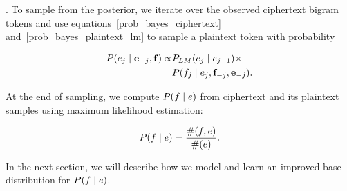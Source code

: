 . To sample from the posterior, we iterate over the observed ciphertext bigram tokens and use equations~\ref{prob_bayes_ciphertext} and~\ref{prob_bayes_plaintext_lm} to sample a plaintext token with probability

\begin{align} \label{prob_sampling_plaintext}
P( e_j \mid \mathbf{e}_{-j}, \mathbf{f} ) \propto & P_{LM}(e_j \mid e_{j-1}) \times \\
                                                                                                & P(f_j \mid e_j,\mathbf{f}_{-j}, \mathbf{e}_{-j}).
\end{align}

\iffalse
%
\[
\label{p_sample}
P_{sample}(e_{1}e_{2}) =  P(e_{1}e_{2}) \prod_{i=1}^{2}P_{CRP}(f_{i}|e_{i})
\]
%
In the above equation, the translation probability $P_{CRP}(f_{i}|e_{i})$ is modeled by the Chinese Restaurant Process(CRP) as defined in Equation \ref{p_channel}.
%
\[
\label{p_channel}
P_{CRP}(f_{i}|e_{i}) = \frac{\alpha P_0(f_{i}|e_{i})+count(f_{i},e_{i})}{\alpha+count(e_{i})}
\]
%
where $P_{0}$ is a base distribution, also known as a prior, and $\alpha$ is a parameter that controls how much we trust the base distribution. $count(f_{i},e_{i})$ and $count(e_{i})$ record the number of times $f_{i},e_{i}$ and $e_{i}$ appear in previously generated samples respectively. The base distribution is given independently, and in all the previous work, it is set to uniform.
\fi

At the end of sampling, we compute $P(f \mid e)$ from ciphertext and its plaintext samples using maximum likelihood estimation:

\[
\label{mlh_estimation}
P(f \mid e) =  \frac{\#(f,e)}{\#(e)}.
\]

In the next section, we will describe how we model and learn an improved base distribution for $P(f \mid e)$.